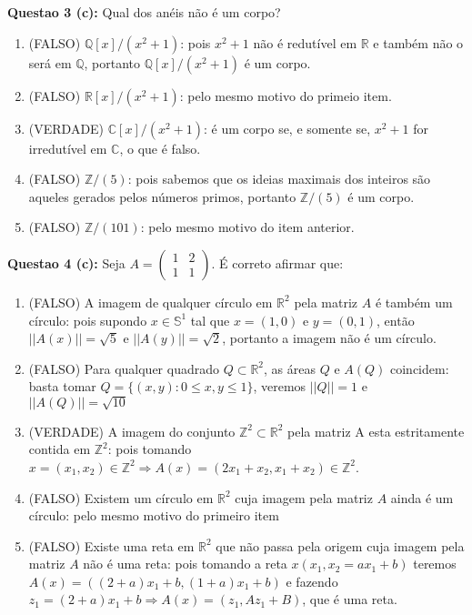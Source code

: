 \documentclass{article}
\begin{document}
\textbf{Questao 3 (c):} Qual dos anéis não é um corpo?
\begin{enumerate}[label=(\alph*)]
	\item (FALSO) $\mathbb{Q}[x]/(x^2+1)$: pois $x^2+1$ não é redutível em $\mathbb{R}$ e também não o será em $\mathbb{Q}$, portanto  $\mathbb{Q}[x]/(x^2+1)$ é um corpo.
	
	\item (FALSO) $\mathbb{R}[x]/(x^2+1)$: pelo mesmo motivo do primeio item.
	
	\item (VERDADE) $\mathbb{C}[x]/(x^2+1)$: é um corpo se, e somente se, $x^2+1$ for irredutível em $\mathbb{C}$, o que é falso.
	
	\item (FALSO) $\mathbb{Z}/(5)$: pois sabemos que os ideias maximais dos inteiros são aqueles gerados pelos números primos, portanto $\mathbb{Z}/(5)$ é um corpo.
	
	\item (FALSO) $\mathbb{Z}/(101)$: pelo mesmo motivo do item anterior.
	
\end{enumerate}
	
	
	
\textbf{Questao 4 (c):} Seja 
$A = 
\left(
\begin{array}{cc}
      1 & 2\\
      1 & 1 
\end{array}
\right)
$. É correto afirmar que:

\begin{enumerate}[label=(\alph{*})]
  \item (FALSO) A imagem de qualquer círculo em $\mathbb R^2$ pela matriz $A$ é
  também um círculo: pois supondo $x \in \mathbb S^1$ tal que $x=(1, 0)$ e
  $y=(0, 1)$, então $||A(x)|| = \sqrt{5}$ e $||A(y)|| = \sqrt{2}$, portanto a
  imagem não é um círculo.
  
  \item (FALSO) Para qualquer quadrado $Q \subset \mathbb R^2$, as áreas $Q$ e
  $A(Q)$ coincidem: basta tomar $Q=\{(x, y): 0 \leq x, y \leq 1\}$, veremos
  $||Q|| = 1$ e $||A(Q)|| = \sqrt{10}$ 
  
  \item (VERDADE) A imagem do conjunto $\mathbb Z^2 \subset \mathbb R^2$ pela
  matriz A esta estritamente contida em $\mathbb Z^2$: pois tomando $x = (x_1,
  x_2) \in \mathbb Z^2 \Rightarrow A(x) = (2x_1 + x_2, x_1+x_2) \in \mathbb
  Z^2$.
  
  \item (FALSO) Existem um círculo em $\mathbb R^2$ cuja imagem pela matriz $A$
  ainda é um círculo: pelo mesmo motivo do primeiro item
  
  \item (FALSO) Existe uma reta em $\mathbb R^2$ que não passa pela origem cuja
  imagem pela matriz $A$ não é uma reta: pois tomando a reta $x(x_1,
  x_2=ax_1+b)$ teremos $A(x) = ((2+a)x_1 + b, (1+a)x_1 + b)$ e fazendo $z_1 =
  (2+a)x_1 + b \Rightarrow A(x) = (z_1, Az_1+B)$, que é uma reta.
\end{enumerate}
\end{document}
